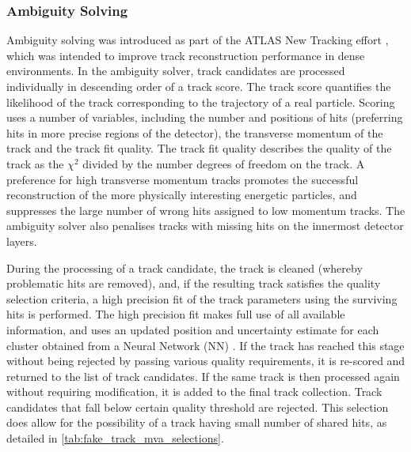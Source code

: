 \subsubsection{Ambiguity Solving}
Ambiguity solving was introduced as part of the ATLAS New Tracking effort \cite{Cornelissen:2007vba}, which was intended to improve track reconstruction performance in dense environments.
In the ambiguity solver, track candidates are processed individually in descending order of a track score. The track score quantifies the likelihood of the track corresponding to the trajectory of a real particle. Scoring uses a number of variables, including the number and positions of hits (preferring hits in more precise regions of the detector), the transverse momentum of the track and the track fit quality. The track fit quality describes the quality of the track as the $\chi^2$ divided by the number degrees of freedom on the track. A preference for high transverse momentum tracks promotes the successful reconstruction of the more physically interesting energetic particles, and suppresses the large number of wrong hits assigned to low momentum tracks.
The ambiguity solver also penalises tracks with missing hits on the innermost detector layers. 

During the processing of a track candidate, the track is cleaned (whereby problematic hits are removed), and, if the resulting track satisfies the quality selection criteria, a high precision fit of the track parameters using the surviving hits is performed.
The high precision fit makes full use of all available information, and uses an updated position and uncertainty estimate for each cluster obtained from a Neural Network (NN) \cite{PERF-2012-05}.
If the track has reached this stage without being rejected by passing various quality requirements, it is re-scored and returned to the list of track candidates.
If the same track is then processed again without requiring modification, it is added to the final track collection.
Track candidates that fall below certain quality threshold are rejected.
This selection does allow for the possibility of a track having small number of shared hits, as detailed in \cref{tab:fake_track_mva_selections}.

